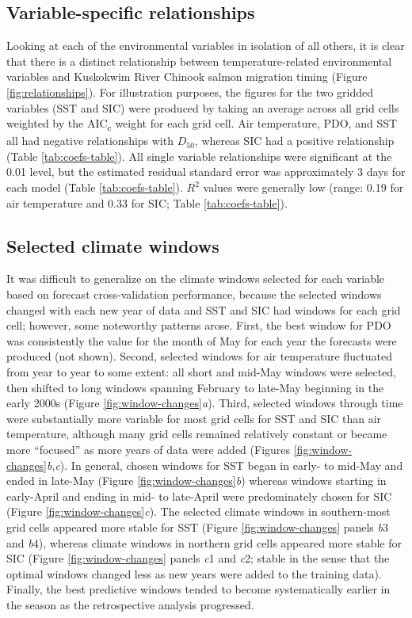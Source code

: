 \documentclass[12pt,]{book}
\theoremstyle{definition}
\theoremstyle{definition}
\theoremstyle{definition}
\theoremstyle{remark}
\begin{document}
\subsection{Variable-specific
relationships}\label{variable-specific-relationships}

\noindent
Looking at each of the environmental variables in isolation of all
others, it is clear that there is a distinct relationship between
temperature-related environmental variables and Kuskokwim River Chinook
salmon migration timing (Figure \ref{fig:relationships}). For
illustration purposes, the figures for the two gridded variables (SST
and SIC) were produced by taking an average across all grid cells
weighted by the AIC\textsubscript{c} weight for each grid cell. Air
temperature, PDO, and SST all had negative relationships with
\(D_{50}\), whereas SIC had a positive relationship (Table
\ref{tab:coefs-table}). All single variable relationships were
significant at the 0.01 level, but the estimated residual standard error
was approximately 3 days for each model (Table \ref{tab:coefs-table}).
\(R^2\) values were generally low (range: 0.19 for air temperature and
0.33 for SIC; Table \ref{tab:coefs-table}).

\subsection{Selected climate windows}\label{selected-climate-windows}

\noindent
It was difficult to generalize on the climate windows selected for each
variable based on forecast cross-validation performance, because the
selected windows changed with each new year of data and SST and SIC had
windows for each grid cell; however, some noteworthy patterns arose.
First, the best window for PDO was consistently the value for the month
of May for each year the forecasts were produced (not shown). Second,
selected windows for air temperature fluctuated from year to year to
some extent: all short and mid-May windows were selected, then shifted
to long windows spanning February to late-May beginning in the early
2000s (Figure \ref{fig:window-changes}\emph{a}). Third, selected windows
through time were substantially more variable for most grid cells for
SST and SIC than air temperature, although many grid cells remained
relatively constant or became more ``focused'' as more years of data
were added (Figures \ref{fig:window-changes}\emph{b},\emph{c}). In
general, chosen windows for SST began in early- to mid-May and ended in
late-May (Figure \ref{fig:window-changes}\emph{b}) whereas windows
starting in early-April and ending in mid- to late-April were
predominately chosen for SIC (Figure \ref{fig:window-changes}\emph{c}).
The selected climate windows in southern-most grid cells appeared more
stable for SST (Figure \ref{fig:window-changes} panels \textit{b}3 and
\textit{b}4), whereas climate windows in northern grid cells appeared
more stable for SIC (Figure \ref{fig:window-changes} panels \textit{c}1
and \textit{c}2; stable in the sense that the optimal windows changed
less as new years were added to the training data). Finally, the best
predictive windows tended to become systematically earlier in the season
as the retrospective analysis progressed.
\end{document}
